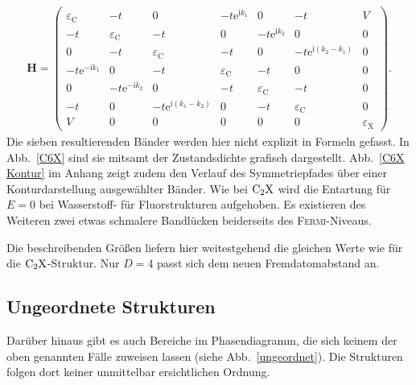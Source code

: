 \documentclass[a4paper, 10pt, twoside, openany]{book} %
\def \I {\mathrm i}
\def \E {\mathrm e}
\def \vec {\boldsymbol}
\def \eC {\varepsilon_\mathrm{C}}
\def \eX {\varepsilon_\mathrm{X}}
\begin{document}
%
\begin{align*}
    \vec H =
    \begin{pmatrix}
        \eC             & -t              &  0                     & -t \E^{\I k_1} &  0             & -t                     &  V \\
        -t              & \eC             & -t                     &  0             & -t \E^{\I k_2} &  0                     &  0 \\
         0              & -t              & \eC                    & -t             &  0             & -t \E^{\I (k_2 - k_1)} &  0 \\
        -t \E^{-\I k_1} &  0              & -t                     & \eC            & -t             &  0                     &  0 \\
         0              & -t \E^{-\I k_2} &  0                     & -t             & \eC            & -t                     &  0 \\
        -t              &  0              & -t \E^{\I (k_1 - k_2)} &  0             & -t             & \eC                    &  0 \\
         V              &  0              &  0                     &  0             &  0             &  0                     & \eX
    \end{pmatrix}.
\end{align*}
%
Die sieben resultierenden Bänder werden hier nicht explizit in Formeln gefasst. In Abb.~\ref{C6X} sind sie mitsamt der Zustandsdichte grafisch dargestellt. Abb.~\ref{C6X Kontur} im Anhang zeigt zudem den Verlauf des Symmetriepfades über einer Konturdarstellung ausgewählter Bänder. Wie bei $\rm C_2X$ wird die Entartung für $E = 0$ bei Wasserstoff- für Fluorstrukturen aufgehoben. Es existieren des Weiteren zwei etwas schmalere Bandlücken beiderseits des \textsc{Fermi}-Niveaus.

Die beschreibenden Größen liefern hier weitestgehend die gleichen Werte wie für die $\rm C_2X$-Struktur. Nur $D = 4$ passt sich dem neuen Fremdatomabstand an.

\subsection{Ungeordnete Strukturen}

Darüber hinaus gibt es auch Bereiche im Phasendiagramm, die sich keinem der oben genannten Fälle zuweisen lassen (siehe Abb.~\ref{ungeordnet}). Die Strukturen folgen dort keiner unmittelbar ersichtlichen Ordnung.
\end{document}
